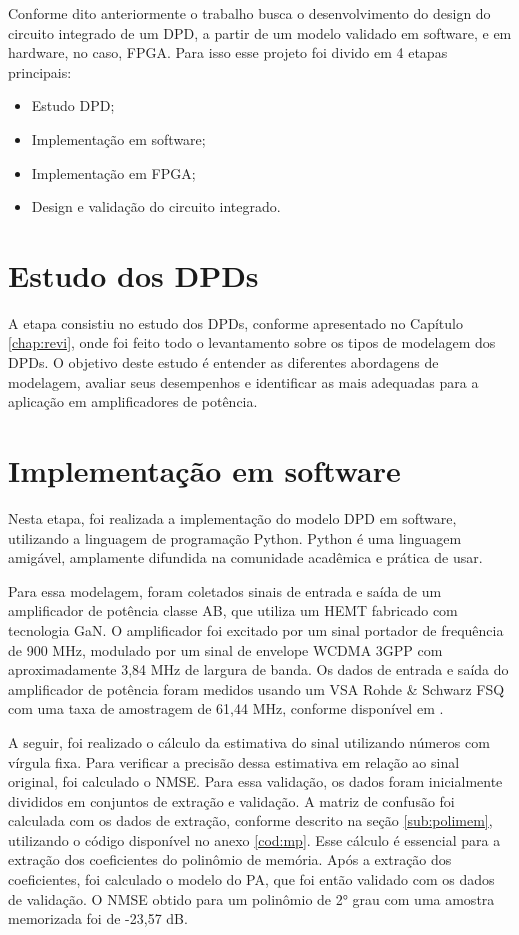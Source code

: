 Conforme dito anteriormente o trabalho busca o desenvolvimento do design do circuito integrado de um DPD, a partir de um modelo validado em software, e em hardware, no caso, FPGA. Para isso esse projeto foi divido em 4 etapas principais:

\begin{itemize}
    \item Estudo DPD;
    \item Implementação em software;
    \item Implementação em FPGA;
    \item Design e validação do circuito integrado.
\end{itemize}

\section{Estudo dos DPDs}
A etapa consistiu no estudo dos DPDs, conforme apresentado no Capítulo \ref{chap:revi}, onde foi feito todo o levantamento sobre os tipos de modelagem dos DPDs. O objetivo deste estudo é entender as diferentes abordagens de modelagem, avaliar seus desempenhos e identificar as mais adequadas para a aplicação em amplificadores de potência.

\section{Implementação em software}

Nesta etapa, foi realizada a implementação do modelo DPD em software, utilizando a linguagem de programação Python. Python é uma linguagem amigável, amplamente difundida na comunidade acadêmica e prática de usar.

Para essa modelagem, foram coletados sinais de entrada e saída de um amplificador de potência classe AB, que utiliza um HEMT fabricado com tecnologia GaN. O amplificador foi excitado por um sinal portador de frequência de 900 MHz, modulado por um sinal de envelope WCDMA 3GPP com aproximadamente 3,84 MHz de largura de banda. Os dados de entrada e saída do amplificador de potência foram medidos usando um VSA Rohde & Schwarz FSQ com uma taxa de amostragem de 61,44 MHz, conforme disponível em \cite{Bonfim2016}.

A seguir, foi realizado o cálculo da estimativa do sinal utilizando números com vírgula fixa. Para verificar a precisão dessa estimativa em relação ao sinal original, foi calculado o NMSE. Para essa validação, os dados foram inicialmente divididos em conjuntos de extração e validação. A matriz de confusão foi calculada com os dados de extração, conforme descrito na seção \ref{sub:polimem}, utilizando o código disponível no anexo \ref{cod:mp}. Esse cálculo é essencial para a extração dos coeficientes do polinômio de memória. Após a extração dos coeficientes, foi calculado o modelo do PA, que foi então validado com os dados de validação. O NMSE obtido para um polinômio de 2° grau com uma amostra memorizada foi de -23,57 dB.


